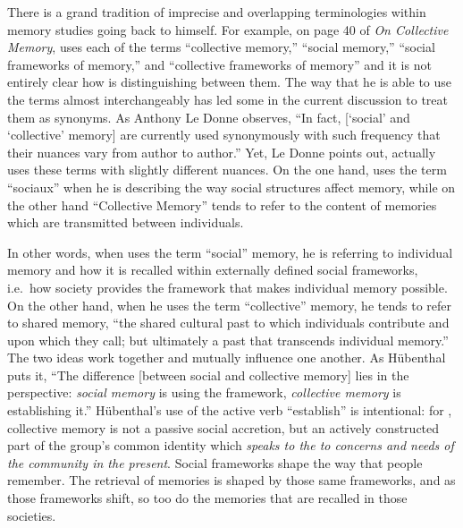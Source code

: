 There is a grand tradition of imprecise and overlapping terminologies within memory studies going back to \halbwachs himself. For example, on page 40 of \emph{On Collective Memory}, \halbwachs uses each of the terms ``collective memory,'' ``social memory,'' ``social frameworks of memory,'' and ``collective frameworks of memory'' and it is not entirely clear how \halbwachs is distinguishing between them. The way that he is able to use the terms almost interchangeably has led some in the current discussion to treat them as synonyms. As Anthony Le Donne observes, ``In fact, {[}`social' and `collective' memory{]} are currently used synonymously with such frequency that their nuances vary from author to author.''\autocite[42 n.8]{ledonne2009} Yet, Le Donne points out, \halbwachs actually uses these terms with slightly different nuances. On the one hand, \halbwachs uses the term ``sociaux'' when he is describing the way social structures affect memory, while on the other hand ``Collective Memory'' tends to refer to the content of memories which are transmitted between individuals.  

In other words, when \halbwachs uses the term ``social'' memory, he is referring to individual memory and how it is recalled within externally defined social frameworks, i.e.~how society provides the framework that makes individual memory possible.\autocite[180]{hubenthal_carstens-hasselbalch2012} On the other hand, when he uses the term ``collective'' memory, he tends to refer to shared memory, ``the shared cultural past to which individuals contribute and upon which they call; but ultimately a past that transcends individual memory.''\autocites[360]{keith_ec2015}[See also][180]{hubenthal_carstens-hasselbalch2012} The two ideas work together and mutually influence one another. As Hübenthal puts it, ``The difference {[}between social and collective memory{]} lies in the perspective: \emph{social memory} is using the framework, \emph{collective memory} is establishing it.''\autocite[180.]{hubenthal_carstens-hasselbalch2012} Hübenthal's use of the active verb ``establish'' is intentional: for \halbwachs, collective memory is not a passive social accretion, but an actively constructed part of the group's common identity which \emph{speaks to the to concerns and needs of the community in the present}. Social frameworks shape the way that people remember. The retrieval of memories is shaped by those same frameworks, and as those frameworks shift, so too do the memories that are recalled in those societies.\autocites[For a modern assessments on the malleability of human memory and the effects of social networks on the formation of collective memory, see][]{coman-etal_pnas2016}{yamashiro-hirst_jarmc2014}{coman-etal_yang-etal2012}  

